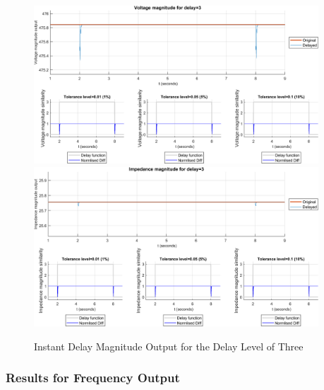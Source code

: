 \begin{figure}
    \caption{Instant Delay Magnitude Output for the Delay Level of Three}
    \includegraphics[width=0.95\textwidth]{PMUsim-figures/DelayOf_3/Instant_vMagnitude.png}    
      \includegraphics[width=0.95\textwidth]{PMUsim-figures/DelayOf_3/Instant_iMagnitude.png}
    \label{fig:PMUsim_Three_Magnitude}
    \begin{small}
     \end{small}
\end{figure}

\newpage \subsubsection{Results for Frequency Output}


